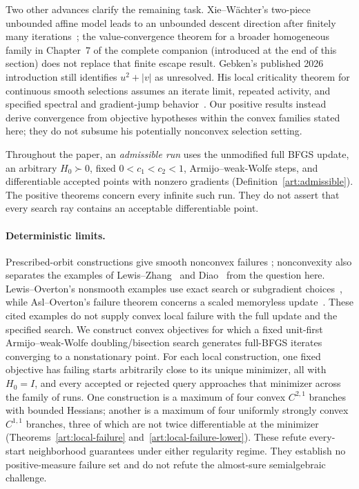 Two other advances clarify the remaining task. Xie--W\"achter's two-piece
unbounded affine model leads to an unbounded descent direction after finitely
many iterations~; the value-convergence theorem for a broader
homogeneous family in Chapter~7 of the complete companion (introduced at the end of this section)
does not replace that finite escape result.
Gebken's published 2026 introduction still identifies $u^2+|v|$ as unresolved.
His local criticality theorem for continuous smooth selections assumes an
iterate limit, repeated activity, and specified spectral and gradient-jump
behavior~\cite[Theorem~3.1 and (B1)]{BG}. Our positive results instead derive
convergence from objective hypotheses within the convex families stated here;
they do not subsume his potentially nonconvex selection setting.

Throughout the paper, an \emph{admissible run} uses the unmodified full BFGS
update, an arbitrary $H_0\succ0$, fixed $0<c_1<c_2<1$, Armijo--weak-Wolfe
steps, and differentiable accepted points with nonzero gradients
(Definition~\ref{art:admissible}). The positive theorems concern every infinite
such run. They do not assert that every search ray contains an acceptable
differentiable point.

\paragraph{Deterministic limits.}
Prescribed-orbit constructions give smooth nonconvex failures
\cite{NEG_M04,NEG_M07}; nonconvexity also separates the examples of
Lewis--Zhang~\cite{NEG_LZ15} and Diao~ from the
question here. Lewis--Overton's nonsmooth examples use exact search or
subgradient choices~, while Asl--Overton's failure
theorem concerns a scaled memoryless update~\cite{NEG_AO21}. These cited
examples do not supply convex local failure with the full update and the
specified search.
We construct convex objectives for which a fixed unit-first
Armijo--weak-Wolfe doubling/bisection search generates full-BFGS iterates
converging to a nonstationary point. For each local construction, one fixed
objective has failing starts arbitrarily close to its unique minimizer, all
with $H_0=I$, and every accepted or rejected query approaches that minimizer
across the family of runs. One construction is a maximum of four convex
$C^{2,1}$ branches with bounded Hessians; another is a maximum of four
uniformly strongly convex $C^{1,1}$ branches, three of which are not twice
differentiable at the minimizer (Theorems~\ref{art:local-failure}
and~\ref{art:local-failure-lower}). These refute every-start neighborhood
guarantees under either regularity regime. They establish no positive-measure
failure set and do not refute the almost-sure semialgebraic challenge.

